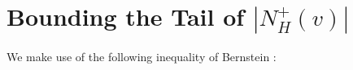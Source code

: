 \documentclass{patmorin}
\newcommand{\trn}{\chi_{\mathrm{us}}}
\begin{document}
%






\appendix

\section{Bounding the Tail of \boldmath$|N_H^+(v)|$}

We make use of the following inequality of Bernstein \cite[Corollary~2.11]{boucheron.lugosi.ea:concentration}:
\end{document}
